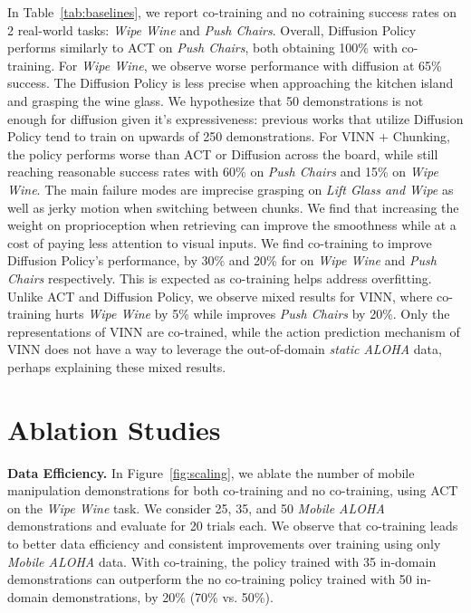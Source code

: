 \documentclass[11pt, a4paper, logo, twocolumn]{stanford}
\newcommand{\method}{\textit{Mobile ALOHA} }
\newcommand{\staticaloha}{\textit{static ALOHA} }
\begin{document}
In Table~\ref{tab:baselines}, we report co-training and no cotraining success rates on 2 real-world tasks: \textit{Wipe Wine} and \textit{Push Chairs}. 
Overall, Diffusion Policy performs similarly to ACT on \textit{Push Chairs}, both obtaining 100\% with co-training. For \textit{Wipe Wine}, we observe worse performance with diffusion at 65\% success. The Diffusion Policy is less precise when approaching the kitchen island and grasping the wine glass. We hypothesize that 50 demonstrations is not enough for diffusion given it's expressiveness: previous works that utilize Diffusion Policy tend to train on upwards of 250 demonstrations.
For VINN + Chunking, the policy performs worse than ACT or Diffusion across the board, while still reaching reasonable success rates with 60\% on \textit{Push Chairs} and 15\% on \textit{Wipe Wine}. The main failure modes are imprecise grasping on \textit{Lift Glass and Wipe} as well as jerky motion when switching between chunks. We find that increasing the weight on proprioception when retrieving can improve the smoothness while at a cost of paying less attention to visual inputs.
We find co-training to improve Diffusion Policy's performance, by 30\% and 20\% for on \textit{Wipe Wine} and \textit{Push Chairs} respectively. This is expected as co-training helps address overfitting.
Unlike ACT and Diffusion Policy, we observe mixed results for VINN, where co-training hurts \textit{Wipe Wine} by 5\% while improves \textit{Push Chairs} by 20\%. Only the representations of VINN are co-trained, while the action prediction mechanism of VINN does not have a way to leverage the out-of-domain \staticaloha data, perhaps explaining these mixed results. 





\section{Ablation Studies}
\noindent \textbf{Data Efficiency.}
In Figure~\ref{fig:scaling}, we ablate the number of mobile manipulation demonstrations for both co-training and no co-training, using ACT on the \textit{Wipe Wine} task. We consider 25, 35, and 50 \method demonstrations and evaluate for 20 trials each. 
We observe that co-training leads to better data efficiency and consistent improvements over training using only \method data. With co-training, the policy trained with 35 in-domain demonstrations can outperform the no co-training policy trained with 50 in-domain demonstrations, by 20\% (70\% vs. 50\%).
\end{document}
